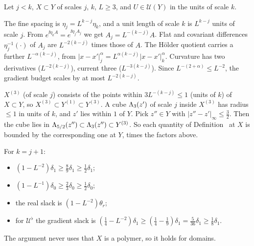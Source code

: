 \begin{detail}\label{d8:ix17}
Let $j<k$, $X\subset Y$ of scales $j$, $k$, $L\ge3$, and $U\in\mathcal U(Y)$ in the units of scale $k$.
\begin{step}[Scaling]
The fine spacing is $\eta_j=L^{k-j}\eta_k$, and a unit length of scale $k$ is $L^{k-j}$ units of scale $j$. From $e^{\ii\eta_kA}=e^{\ii\eta_jA_j}$ we get $A_j=L^{-(k-j)}A$. Flat and covariant differences $\eta_j^{-1}(\cdot)$ of $A_j$ are $L^{-2(k-j)}$ times those of $A$. The H\"older quotient carries a further $L^{-\alpha(k-j)}$, from $|x-x'|_j^\alpha=L^{\alpha(k-j)}|x-x'|_k^\alpha$. Curvature has two derivatives ($L^{-2(k-j)}$), current three ($L^{-3(k-j)}$). Since $L^{-(2+\alpha)}\le L^{-2}$, the gradient budget scales by at most $L^{-2(k-j)}$.
\end{step}
\begin{step}
$X^{(3)}$ (of scale $j$) consists of the points within $3L^{-(k-j)}\le1$ (units of $k$) of $X\subset Y$, so $X^{(3)}\subset Y^{(1)}\subset Y^{(3)}$. A cube $\Lambda_3(z')$ of scale $j$ inside $X^{(3)}$ has radius $\le1$ in units of $k$, and $z'$ lies within $1$ of $Y$. Pick $z''\in Y$ with $|z''-z'|_\infty\le\frac32$. Then the cube lies in $\Lambda_{5/2}(z'')\subset\Lambda_3(z'')\subset Y^{(3)}$. So each quantity of Definition~ at $X$ is bounded by the corresponding one at $Y$, times the factors above.
\end{step}
\begin{step}[Slacks]
For $k=j+1$:
\begin{itemize}
\item $(1-L^{-2})\delta_1\ge\frac89\delta_1\ge\frac12\delta_1$;
\item $(1-L^{-1})\delta_0\ge\frac23\delta_0\ge\frac12\delta_0$;
\item the real slack is $(1-L^{-2})\theta_r$;
\item for $\mathcal U^\flat$ the gradient slack is $(\frac14-L^{-2})\delta_1\ge(\frac14-\frac19)\delta_1=\frac5{36}\delta_1\ge\frac18\delta_1$.
\end{itemize}
The argument never uses that $X$ is a polymer, so it holds for domains.
\end{step}
\end{detail}

